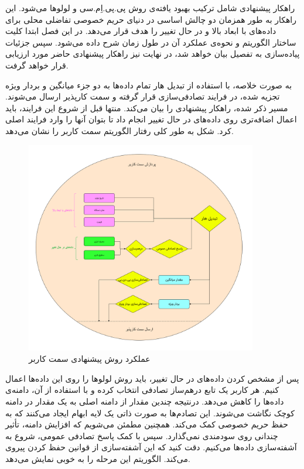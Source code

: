 
راهکار پیشنهادی شامل ترکیب بهبود یافته‌ی روش پی.پی.اِم.سی و لولوها می‌شود. این راهکار به طور همزمان دو چالش اساسی در دنیای حریم خصوصی تفاضلی محلی برای داده‌های با ابعاد بالا و در حال تغییر را هدف قرار می‌دهد. در این فصل ابتدا کلیت ساختار الگوریتم و نحوه‌ی عملکرد آن در طول زمان شرح داده‌ می‌شود. سپس جزئیات پیاده‌سازی به تفصیل بیان خواهد شد، در نهایت نیز راهکار پیشنهادی حاضر مورد ارزیابی قرار خواهد گرفت.


به صورت خلاصه، با استفاده از تبدیل هار تمام داده‌ها به دو جزء میانگین و بردار ویژه تجزیه شده، در فرایند تصادفی‌سازی قرار گرفته و سمت کارپذیر ارسال می‌شوند. مسیر ذکر شده،  راهکار پیشنهادی را بیان می‌کند. منتها قبل از شروع این فرایند، باید اعمال اضافه‌تری روی داده‌های در حال تغییر انجام داد تا بتوان آنها را وارد فرایند اصلی کرد. شکل  به طور کلی رفتار الگوریتم سمت کاربر را نشان می‌دهد.

\begin{figure}[h]
  \centering
  \includegraphics[width=0.9\textwidth]{figs/thesis-client.png}
  \caption{عملکرد روش پیشنهادی سمت کاربر}
  \label{fig:thesisClient}
\end{figure}



پس از مشخص کردن داده‌های در حال تغییر، باید روش لولوها را روی این داده‌ها اعمال کنیم. هر کاربر یک تابع درهم‌ساز تصادفی انتخاب کرده و با استفاده از آن، دامنه‌ی داده‌ها را کاهش می‌دهد. درنتیجه چندین مقدار از دامنه اصلی به یک مقدار در دامنه کوچک نگاشت می‌شوند. این تصادم‌ها به صورت ذاتی یک لایه ابهام ایجاد می‌کنند که به حفظ حریم خصوصی کمک می‌کند. همچنین مطمئن می‌شویم که افزایش دامنه، تأثیر چندانی روی سودمندی نمی‌گذارد. سپس با کمک پاسخ تصادفی عمومی، شروع به آشفته‌سازی داده‌ها می‌کنیم. دقت کنید که این آشفته‌سازی از قوانین حفظ کردن پیروی می‌کند. الگوریتم  این مرحله را به خوبی نمایش می‌دهد. 


